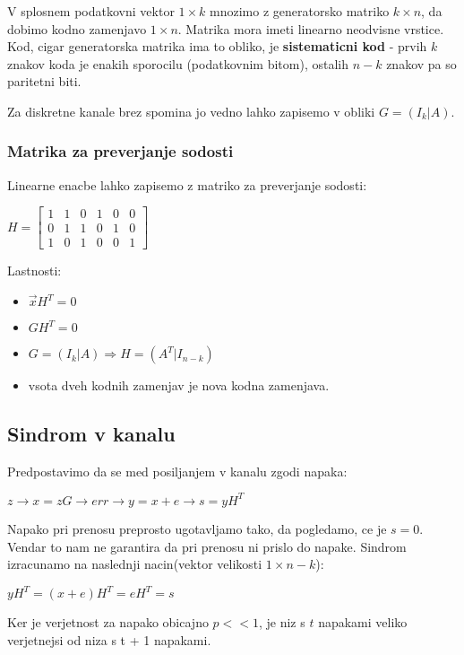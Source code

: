 \documentclass{article}
\begin{document}
\begin{multicols}{3}
V splosnem podatkovni vektor $1 \times k$ mnozimo z generatorsko matriko $k \times n$, da dobimo kodno zamenjavo
$1 \times n$. Matrika mora imeti linearno neodvisne vrstice. Kod, cigar generatorska matrika ima to obliko, je
\textbf{sistematicni kod} - prvih $k$ znakov koda je enakih sporocilu (podatkovnim bitom), ostalih $n-k$ znakov pa so
paritetni biti.

Za diskretne kanale brez spomina jo vedno lahko zapisemo v obliki $G = (I_k | A)$.

\subsubsection{Matrika za preverjanje sodosti}
Linearne enacbe lahko zapisemo z matriko za preverjanje sodosti:

\begin{center}
    \begin{math}
        H =
        \begin{bmatrix}
            1 & 1 & 0 & 1 & 0 & 0 \\
            0 & 1 & 1 & 0 & 1 & 0 \\
            1 & 0 & 1 & 0 & 0 & 1 
        \end{bmatrix}
    \end{math}
\end{center}

Lastnosti:
\begin{itemize}
    \item $\vec{x}H^T = 0$
    \item $GH^T = 0$
    \item $G = (I_k | A) \Rightarrow H = (A^T | I_{n-k})$
    \item vsota dveh kodnih zamenjav je nova kodna zamenjava.
\end{itemize}

\subsection{Sindrom v kanalu}
Predpostavimo da se med posiljanjem v kanalu zgodi napaka:
\begin{center}
    \begin{math}
        z \rightarrow x = zG \rightarrow err\rightarrow y = x + e \rightarrow s = yH^T
    \end{math}
\end{center}
Napako pri prenosu preprosto ugotavljamo tako, da pogledamo, ce je $s = 0$. Vendar to nam ne garantira da pri prenosu ni prislo do napake.
Sindrom izracunamo na naslednji nacin(vektor velikosti $1 \times n - k$):
\begin{center}
    \begin{math}
        yH^T = (x + e)H^T = eH^T = s
    \end{math}
\end{center}
Ker je verjetnost za napako obicajno $p << 1$, je niz s $t$ napakami veliko
verjetnejsi od niza s t + 1 napakami.


\end{multicols}
\end{document}
